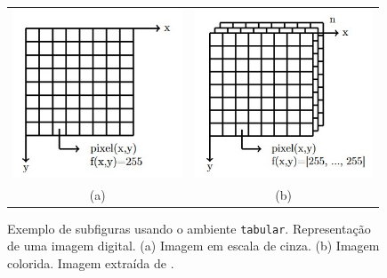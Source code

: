 \begin{figure}[H]
	\begin{center}
		\begin{tabular}{cc}
			\includegraphics[height=5cm]{imagens/capitulo2/imagemCinza.jpg} & 
			\includegraphics[height=5cm]{imagens/capitulo2/imagemColorida.jpg} \\
			(a) & (b) 
		\end{tabular}
	\end{center}
	\caption{Exemplo de subfiguras usando o ambiente \texttt{tabular}. Representação de uma imagem digital. (a) Imagem em escala de cinza. (b) Imagem colorida. Imagem extraída de \parencite{Barbosa2020}.}
	\label{fig:subfigtabular}
\end{figure}

